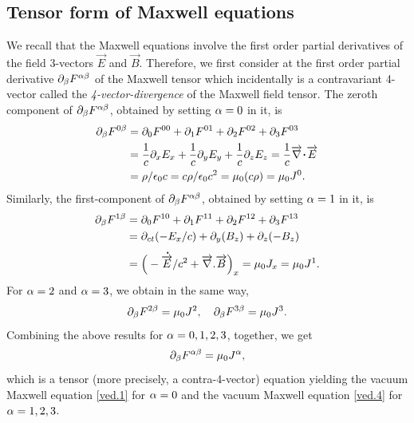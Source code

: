 \subsection{Tensor form of Maxwell equations}
We recall that the Maxwell equations involve the first 
order 
partial derivatives of the field 3-vectors $\vec{E}$ and 
$\vec{B}$.  Therefore, we first consider at the first order 
partial derivative ${\partial}_{{\beta}} F^{{\alpha}{\beta}}$ of the Maxwell 
tensor which incidentally is a contravariant 4-vector 
call\break ed the \textsl{4-vector-divergence} of the Maxwell field 
tensor. The zeroth component of ${\partial}_{{\beta}} F^{{\alpha}{\beta}}$, 
obtained by setting ${\alpha}=0$ in it, is
\begin{align*}
\dow_\gkb F^{0\gkb}&=\dow_0 F^{00}+\dow_1 F^{01}
+\dow_2 F^{02}+\dow_3 F^{03}\\
&=\frac{1}{c}\dow_x E_x+\frac{1}{c}\dow_y
E_y +\frac{1}{c}\dow_z E_z =\frac{1}{c}\vnab \dotp \vec{E}\\
&= \rho/\epso c=c\rho/\epso c^2 =\mu_0 (c\rho)=\mu_0 J^0.
\end{align*}
Similarly, the first-component of ${\partial}_{{\beta}} F^{{\alpha}{\beta}}$, 
obtained by setting   ${\alpha}=1$  in it, is
\begin{align*}
{\ensuremath{\partial}}_{{\beta}} F^{1{\beta}}
&={\partial}_0 F^{10}+{\partial}_1 F^{11} +{\partial}_2 F^{12}+{\partial}_3 F^{13}\\
&={\partial}_{ct}(-E_x/c)+{\partial}_y (B_z)+{\partial}_z (-B_z)\\ 
&= \Big(-{\overset{\hspace*{1.5pt}\centerdot}{\overrightarrow{E}} }/c^2+ {\overrightarrow{\nabla} } .\overrightarrow{B}\Big)_x =\mu_0 
J_x=\mu_0 J^1.
\end{align*}
For ${\alpha}=2$ and ${\alpha}=3$, we obtain in the same way,
\begin{align*}
{\ensuremath{\partial}}_{{\beta}} F^{2{\beta}}=\mu_0 J^2,\quad {\ensuremath{\partial}}_{{\beta}} 
F^{3{\beta}}=\mu_0 J^3.
\end{align*}
Combining the above results for ${\alpha}=0, 1, 2, 3$, 
together, we get
\begin{equation}\label{ved.38x}
{\ensuremath{\partial}}_{{\beta}} F^{{\alpha}{\beta}}= \mu_0 J^{{\alpha}} ,
\end{equation}
which is a tensor (more precisely, a contra-4-vector) 
equation yield\break ing the vacuum Maxwell equation 
\eqref{ved.1} for  ${\alpha}=0$ and the vacuum Maxwell equation 
\eqref{ved.4}  for ${\alpha}=1, 2, 3$.

